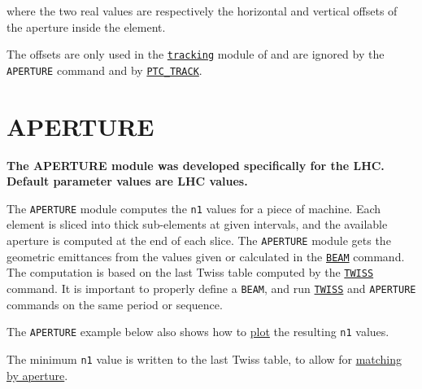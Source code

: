 where the two real values are respectively the horizontal and vertical
offsets of the aperture inside the element. 

The offsets are only used in the
\hyperref[chap:thintrack]{\texttt{tracking}}  
module of \madx and are ignored by the \texttt{APERTURE} command and by 
\hyperref[sec:ptc-track]{\texttt{PTC\_TRACK}}.


\section{APERTURE}
\label{sec:aperture}
\textbf{The APERTURE module was developed specifically for the LHC.\\ 
Default parameter values are LHC values.} 

The \texttt{APERTURE} module computes the \texttt{n1} values for a piece of machine. 
Each element is sliced into thick sub-elements at given intervals, and
the available aperture is computed at the end of each slice. 
The \texttt{APERTURE} module gets the geometric emittances from the values given 
or calculated in the \hyperref[chap:beam]{\texttt{BEAM}} command. 
The computation is based on the last Twiss table computed by the 
\hyperref[chap:twiss]{\texttt{TWISS}} command. 
It is important to properly define a \texttt{BEAM}, and run 
\hyperref[chap:twiss]{\texttt{TWISS}} and \texttt{APERTURE} commands 
on the same period or sequence.

The \texttt{APERTURE} example below also shows how to \hyperref[chap:plot]{plot} 
the resulting \texttt{n1} values.

The minimum \texttt{n1} value is written to the last Twiss table, to
allow for \hyperref[chap:match]{matching by aperture}.


